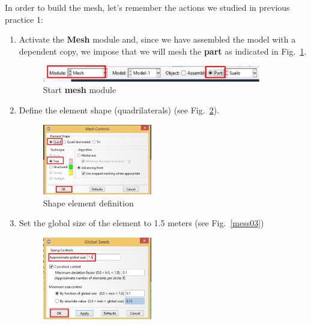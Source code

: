   In order to build the mesh, let's remember the actions we studied
  in previous practice 1:
  \begin{enumerate}
  \item Activate the \textbf{Mesh} module and, since we have assembled
    the model with a dependent copy, we impose that we will mesh the
    \textbf {part} as indicated in Fig.~\ref{mess01}.
    \begin{figure}[!h]
      \begin{center}
        \includegraphics[width=0.9\textwidth]{./body/images/mess01.pdf}
      \end{center}
      \caption{Start \textbf{mesh} module}
      \label{mess01}
    \end{figure}
  \item Define the element shape (quadrilaterals) (see
    Fig.~\ref{mess02}).
    \begin{figure}[!h]
      \begin{center}
        \includegraphics[width=0.45\textwidth]{./body/images/mess02.pdf}
      \end{center}
      \caption{Shape element definition}
      \label{mess02}
    \end{figure}
  \item Set the global size of the element to 1.5 meters (see
    Fig.~\ref{mess03})
    \begin{figure}[!h]
      \begin{center}
        \includegraphics[width=0.45\textwidth]{./body/images/mess03.pdf}

\end{center}
\end{figure}
\end{enumerate}
